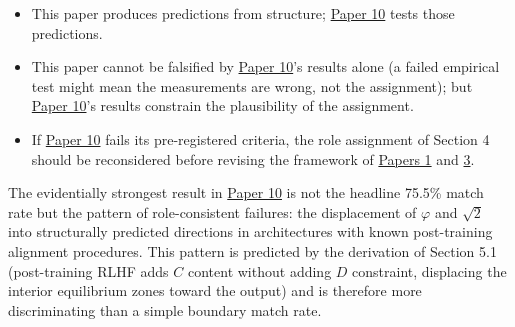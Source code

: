 \documentclass[
  11pt,
  letterpaper,
]{article}
\providecommand{\tightlist}{%
  \setlength{\itemsep}{0pt}\setlength{\parskip}{0pt}}
\begin{document}
\begin{itemize}
\tightlist
\item
  This paper produces predictions from structure;
  \href{https://github.com/baardev/truevalue/blob/main/docnav/Research/papers/10_tholonic-neural-architecture/10_tholonic-neural-architecture.pdf}{Paper
  10} tests those predictions.
\item
  This paper cannot be falsified by
  \href{https://github.com/baardev/truevalue/blob/main/docnav/Research/papers/10_tholonic-neural-architecture/10_tholonic-neural-architecture.pdf}{Paper
  10}'s results alone (a failed empirical test might mean the
  measurements are wrong, not the assignment); but
  \href{https://github.com/baardev/truevalue/blob/main/docnav/Research/papers/10_tholonic-neural-architecture/10_tholonic-neural-architecture.pdf}{Paper
  10}'s results constrain the plausibility of the assignment.
\item
  If
  \href{https://github.com/baardev/truevalue/blob/main/docnav/Research/papers/10_tholonic-neural-architecture/10_tholonic-neural-architecture.pdf}{Paper
  10} fails its pre-registered criteria, the role assignment of Section
  4 should be reconsidered before revising the framework of
  \href{https://github.com/baardev/truevalue/blob/main/docnav/Research/papers/1_recursive-tholonic-five-constants/1_recursive-tholonic-five-constants.pdf}{Papers
  1} and
  \href{https://github.com/baardev/truevalue/blob/main/docnav/Research/papers/3_minimal-recursive-triadic-framework/3_minimal-recursive-triadic-framework.pdf}{3}.
\end{itemize}

The evidentially strongest result in
\href{https://github.com/baardev/truevalue/blob/main/docnav/Research/papers/10_tholonic-neural-architecture/10_tholonic-neural-architecture.pdf}{Paper
10} is not the headline 75.5\% match rate but the pattern of
role-consistent failures: the displacement of \(\varphi\) and
\(\sqrt{2}\) into structurally predicted directions in architectures
with known post-training alignment procedures. This pattern is predicted
by the derivation of Section 5.1 (post-training RLHF adds \(C\) content
without adding \(D\) constraint, displacing the interior equilibrium
zones toward the output) and is therefore more discriminating than a
simple boundary match rate.
\end{document}
